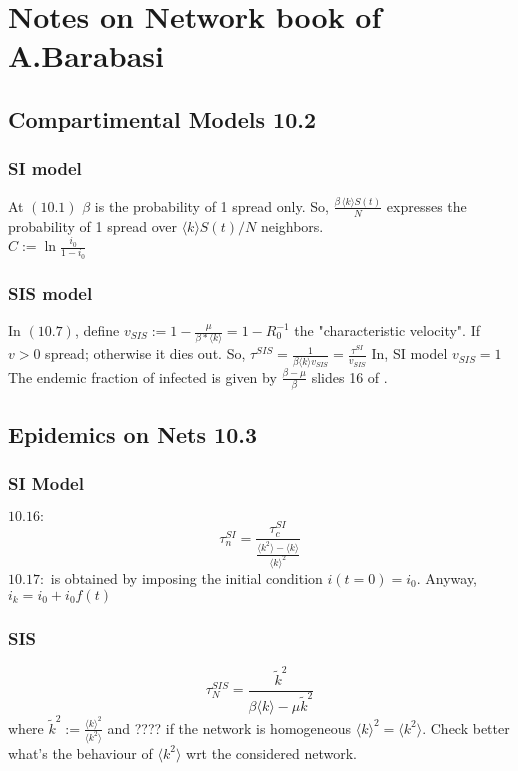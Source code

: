 \documentclass[a4paper,11pt,twoside]{report} %
\begin{document}
\section{Notes on Network book of A.Barabasi}

\subsection{Compartimental Models 10.2}
\subsubsection{SI model}
At $(10.1)$ $\beta$ is the probability of 1 spread only. So, $\frac{\beta \, \langle k \rangle S(t)}{N}$ expresses the probability of 1 spread over $\langle k\rangle S(t)/N$ neighbors. \\
$C:=\ln{\frac{i_0}{1-i_0}}$

\subsubsection{SIS model}

In $(10.7)$, define $v_{SIS}:=1-\frac{\mu}{\beta*\langle k\rangle }=1-R_0^{-1}$ the "characteristic velocity". If $v>0$ spread; otherwise it dies out. So, $\tau^{SIS}=\frac{1}{\beta\langle k\rangle v_{SIS}}=\frac{\tau^{SI}}{v_{SIS}}$ In, SI model $v_{SIS}=1$ \cite{barabasi2016network}
\newline
The endemic fraction of infected is given by $\frac{\beta-\mu}{\beta}$ slides 16 of \cite{lde_slides}.

\subsection{Epidemics on Nets 10.3}

\subsubsection{SI Model}
$10.16:$ $$\tau_n^{SI}=\frac{\tau_{c}^{SI}}{\frac{\langle k^2 \rangle -\langle k\rangle}{\langle k\rangle^2}}$$
\newline
$10.17:$ is obtained by imposing the initial condition $i(t=0)=i_0$. Anyway, $i_k=i_0+i_0f(t)$

\subsubsection{SIS}

$$\tau_N^{SIS}=\frac{\tilde{k}^2}{\beta\langle k\rangle-\mu\tilde{k}^2}$$ 
\newline
where $\tilde{k}^2:=\frac{\langle k\rangle^2}{\langle k^2 \rangle }$ and ???? if the network is homogeneous
$\langle k\rangle^2=\langle k^2 \rangle .$
Check better what's the behaviour of $\langle k^2 \rangle $ wrt the considered network.
\end{document}
